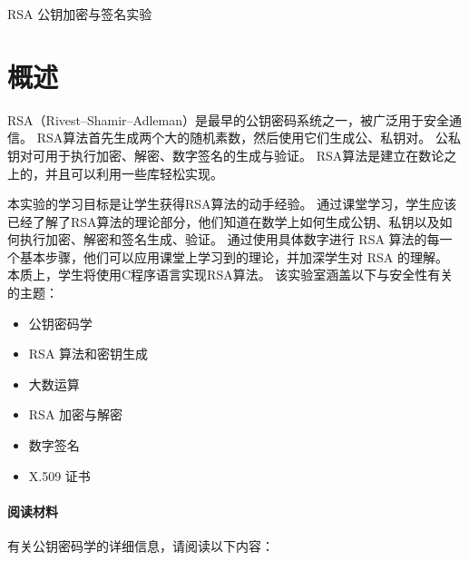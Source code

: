 







\begin{center}
{\LARGE RSA 公钥加密与签名实验}
\end{center}



\section{概述}

RSA（Rivest–Shamir–Adleman）是最早的公钥密码系统之一，被广泛用于安全通信。
RSA算法首先生成两个大的随机素数，然后使用它们生成公、私钥对。
公私钥对可用于执行加密、解密、数字签名的生成与验证。
RSA算法是建立在数论之上的，并且可以利用一些库轻松实现。

本实验的学习目标是让学生获得RSA算法的动手经验。
通过课堂学习，学生应该已经了解了RSA算法的理论部分，他们知道在数学上如何生成公钥、私钥以及如何执行加密、解密和签名生成、验证。
通过使用具体数字进行 RSA 算法的每一个基本步骤，他们可以应用课堂上学习到的理论，并加深学生对 RSA 的理解。
本质上，学生将使用C程序语言实现RSA算法。
该实验室涵盖以下与安全性有关的主题：

\begin{itemize}[noitemsep]
\item 公钥密码学
\item RSA 算法和密钥生成
\item 大数运算
\item RSA 加密与解密
\item 数字签名
\item X.509 证书
\end{itemize}

\paragraph{阅读材料}
有关公钥密码学的详细信息，请阅读以下内容：

